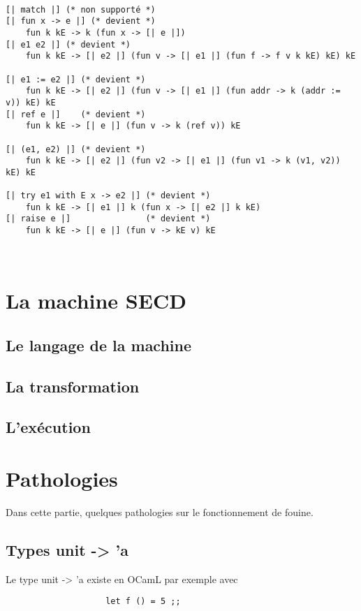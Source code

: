 \documentclass{article}
\newcommand\code[1]{{\fontfamily{lmtt}\selectfont #1}}
\begin{document}
	\begin{verbatim}
	
[| match |] (* non supporté *)
[| fun x -> e |] (* devient *) 
	fun k kE -> k (fun x -> [| e |]) 
[| e1 e2 |] (* devient *) 
	fun k kE -> [| e2 |] (fun v -> [| e1 |] (fun f -> f v k kE) kE) kE

[| e1 := e2 |] (* devient *) 
	fun k kE -> [| e2 |] (fun v -> [| e1 |] (fun addr -> k (addr := v)) kE) kE
[| ref e |]    (* devient *) 
	fun k kE -> [| e |] (fun v -> k (ref v)) kE

[| (e1, e2) |] (* devient *) 
	fun k kE -> [| e2 |] (fun v2 -> [| e1 |] (fun v1 -> k (v1, v2)) kE) kE	

[| try e1 with E x -> e2 |] (* devient *) 
	fun k kE -> [| e1 |] k (fun x -> [| e2 |] k kE)
[| raise e |]               (* devient *) 
	fun k kE -> [| e |] (fun v -> kE v) kE
	
	
	\end{verbatim}


\section{La machine SECD}

\subsection{Le langage de la machine}



\subsection{La transformation}

\subsection{L'exécution}


\section{Pathologies}

	Dans cette partie, quelques pathologies sur le fonctionnement de fouine.
	
	
	\subsection{Types \code{unit -> 'a}}

	Le type \code{unit -> 'a} existe en OCamL par exemple avec
	\begin{verbatim}
					let f () = 5 ;;
	\end{verbatim}
\end{document}
